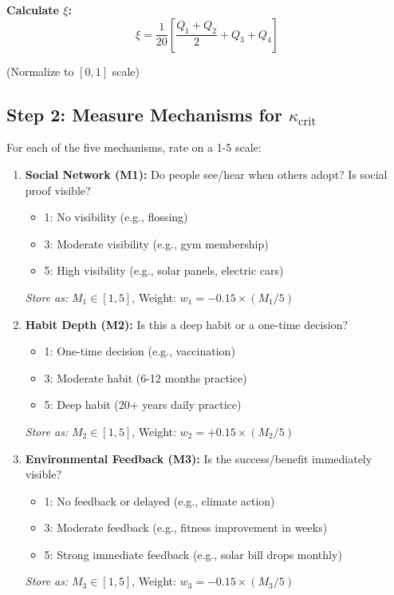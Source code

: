 \documentclass[11pt, a4paper]{article}
\begin{document}
\noindent
\textbf{Calculate $\xi$:}
\begin{equation}
\xi = \frac{1}{20} \left[ \frac{Q_1 + Q_2}{2} + Q_3 + Q_4 \right]
\end{equation}

\noindent
(Normalize to $[0, 1]$ scale)

\subsection{Step 2: Measure Mechanisms for $\kappa_{\text{crit}}$}

For each of the five mechanisms, rate on a 1-5 scale:

\begin{enumerate}
    \item \textbf{Social Network (M1):}
    Do people see/hear when others adopt? Is social proof visible?
    \begin{itemize}
        \item 1: No visibility (e.g., flossing)
        \item 3: Moderate visibility (e.g., gym membership)
        \item 5: High visibility (e.g., solar panels, electric cars)
    \end{itemize}
    \textit{Store as:} $M_1 \in [1, 5]$, Weight: $w_1 = -0.15 \times (M_1/5)$

    \item \textbf{Habit Depth (M2):}
    Is this a deep habit or a one-time decision?
    \begin{itemize}
        \item 1: One-time decision (e.g., vaccination)
        \item 3: Moderate habit (6-12 months practice)
        \item 5: Deep habit (20+ years daily practice)
    \end{itemize}
    \textit{Store as:} $M_2 \in [1, 5]$, Weight: $w_2 = +0.15 \times (M_2/5)$

    \item \textbf{Environmental Feedback (M3):}
    Is the success/benefit immediately visible?
    \begin{itemize}
        \item 1: No feedback or delayed (e.g., climate action)
        \item 3: Moderate feedback (e.g., fitness improvement in weeks)
        \item 5: Strong immediate feedback (e.g., solar bill drops monthly)
    \end{itemize}
    \textit{Store as:} $M_3 \in [1, 5]$, Weight: $w_3 = -0.15 \times (M_3/5)$


\end{enumerate}
\end{document}
